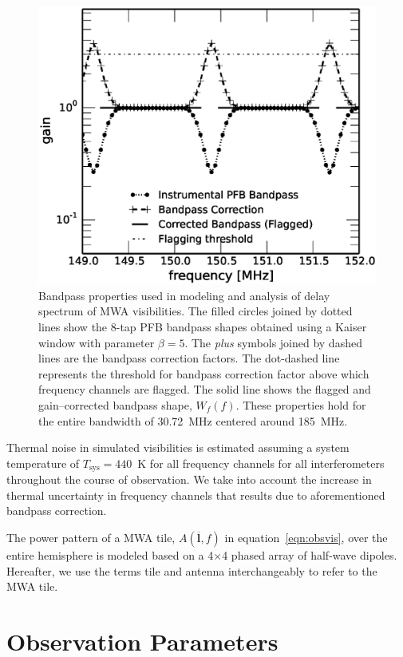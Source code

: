 \documentclass[preprint2,iop,numberedappendix]{emulateapj}
\begin{document}
\begin{figure}[htb]
\centering
\includegraphics[width=\linewidth]{figures/v1_0/bandpass_properties}
\caption{Bandpass properties used in modeling and analysis of delay spectrum of MWA visibilities. The filled circles joined by dotted lines show the 8-tap PFB bandpass shapes obtained using a Kaiser window with parameter $\beta=5$. The {\it plus} symbols joined by dashed lines are the bandpass correction factors. The dot-dashed line represents the threshold for bandpass correction factor above which frequency channels are flagged. The solid line shows the flagged and gain--corrected bandpass shape, $W_f(f)$. These properties hold for the entire bandwidth of 30.72~MHz centered around 185~MHz. \label{fig:bandpass}}
\end{figure}

Thermal noise in simulated visibilities is estimated assuming a system temperature of $T_\textrm{sys}=440$~K \citep{bow06} for all frequency channels for all interferometers throughout the course of observation. We take into account the increase in thermal uncertainty in frequency channels that results due to aforementioned bandpass correction. 

The power pattern of a MWA tile, $A(\overline{\mathbf{l}},f)$ in equation~\ref{eqn:obsvis}, over the entire hemisphere is modeled based on a 4$\times$4 phased array of half-wave dipoles. Hereafter, we use the terms tile and antenna interchangeably to refer to the MWA tile. 

\section{Observation Parameters}\label{sec:obsparms}
\end{document}
